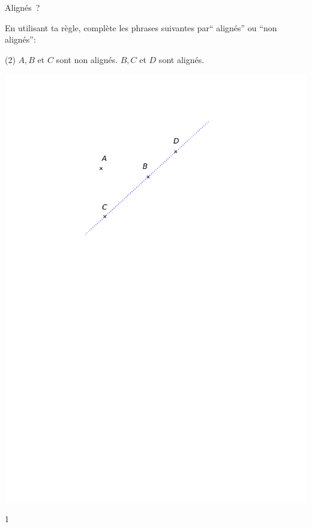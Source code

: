 \documentclass[a4paper,11pt]{report}
\begin{document}
\begin{resolu}{Alignés~?}
{En utilisant ta règle, complète les phrases suivantes par`` alignés'' ou ``non alignés'':
\begin{tasks}(2)
    \task $A,B$ et $C$ sont  non alignés.
    \task $B,C$ et $D$ sont alignés.
\end{tasks}
\begin{center}
	\includegraphics[scale=0.8]{media/es-11/13-r2}
\end{center}
}
{1}
\end{resolu}
\end{document}
